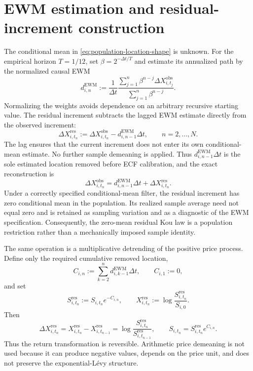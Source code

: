 \documentclass[11pt]{article}
\begin{document}
\section{EWM estimation and residual-increment construction}\label{sec:ewm-drift}

The conditional mean in \eqref{eq:population-location-shape} is unknown. For the empirical
horizon $T=1/12$, set $\beta=2^{-\Delta t/T}$ and estimate its annualized path by the
normalized causal EWM
\begin{equation}\label{eq:normalized-ewm}
d_{i,n}^{\mathrm{EWM}}
:=\frac{1}{\Delta t}
\frac{\sum_{j=1}^{n}\beta^{n-j}\Delta X_{i,t_j}^{\mathrm{obs}}}
     {\sum_{j=1}^{n}\beta^{n-j}}.
\end{equation}
Normalizing the weights avoids dependence on an arbitrary recursive starting value. The
residual increment subtracts the lagged EWM estimate directly from the observed increment:
\begin{equation}\label{eq:ewm-residual-increments}
\boxed{\Delta X_{i,t_n}^{\mathrm{res}}
:=\Delta X_{i,t_n}^{\mathrm{obs}}
-d_{i,n-1}^{\mathrm{EWM}}\Delta t},
\qquad n=2,\ldots,N.
\end{equation}
The lag ensures that the current increment does not enter its own conditional-mean estimate.
No further sample demeaning is applied. Thus $d_{i,n-1}^{\mathrm{EWM}}\Delta t$ is the sole
estimated location removed before ECF calibration, and the exact reconstruction is
\begin{equation}\label{eq:return-reconstruction}
\boxed{\Delta X_{i,t_n}^{\mathrm{obs}}
=d_{i,n-1}^{\mathrm{EWM}}\Delta t
+\Delta X_{i,t_n}^{\mathrm{res}}}.
\end{equation}
Under a correctly specified conditional-mean filter, the residual increment has zero
conditional mean in the population. Its realized sample average need not equal zero and is
retained as sampling variation and as a diagnostic of the EWM specification. Consequently,
the zero-mean residual Kou law is a population restriction rather than a mechanically imposed
sample identity.

The same operation is a multiplicative detrending of the positive price process. Define only
the required cumulative removed location,
\begin{equation}\label{eq:multiplicative-detrending}
C_{i,n}
:=\sum_{k=2}^{n}d_{i,k-1}^{\mathrm{EWM}}\Delta t,
\qquad C_{i,1}:=0,
\end{equation}
and set
\begin{equation}\label{eq:residual-price}
S_{i,t_n}^{\mathrm{res}}:=S_{i,t_n}e^{-C_{i,n}},
\qquad
X_{i,t_n}^{\mathrm{res}}:=\log\frac{S_{i,t_n}^{\mathrm{res}}}{S_{i,0}}.
\end{equation}
Then
\begin{equation}\label{eq:price-return-equivalence}
\Delta X_{i,t_n}^{\mathrm{res}}
=X_{i,t_n}^{\mathrm{res}}-X_{i,t_{n-1}}^{\mathrm{res}}
=\log\frac{S_{i,t_n}^{\mathrm{res}}}{S_{i,t_{n-1}}^{\mathrm{res}}},
\qquad
S_{i,t_n}=S_{i,t_n}^{\mathrm{res}}e^{C_{i,n}}.
\end{equation}
Thus the return transformation is reversible. Arithmetic price demeaning is not used because
it can produce negative values, depends on the price unit, and does not preserve the
exponential-L\'evy structure.
\end{document}
